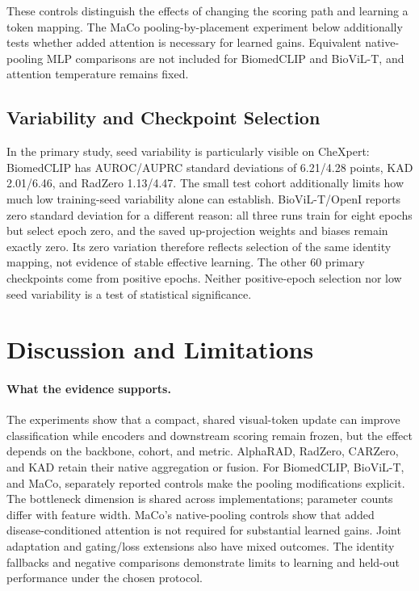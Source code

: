 \documentclass[10pt,twocolumn,letterpaper]{article}
\begin{document}
These controls distinguish the effects of changing the scoring path and learning a token mapping. The MaCo pooling-by-placement experiment below additionally tests whether added attention is necessary for learned gains. Equivalent native-pooling MLP comparisons are not included for BiomedCLIP and BioViL-T, and attention temperature remains fixed.



\subsection{Variability and Checkpoint Selection}
In the primary study, seed variability is particularly visible on CheXpert: BiomedCLIP has AUROC/AUPRC standard deviations of 6.21/4.28 points, KAD 2.01/6.46, and RadZero 1.13/4.47. The small test cohort additionally limits how much low training-seed variability alone can establish. BioViL-T/OpenI reports zero standard deviation for a different reason: all three runs train for eight epochs but select epoch zero, and the saved up-projection weights and biases remain exactly zero. Its zero variation therefore reflects selection of the same identity mapping, not evidence of stable effective learning. The other 60 primary checkpoints come from positive epochs. Neither positive-epoch selection nor low seed variability is a test of statistical significance.

\section{Discussion and Limitations}
\paragraph{What the evidence supports.}
The experiments show that a compact, shared visual-token update can improve classification while encoders and downstream scoring remain frozen, but the effect depends on the backbone, cohort, and metric. AlphaRAD, RadZero, CARZero, and KAD retain their native aggregation or fusion. For BiomedCLIP, BioViL-T, and MaCo, separately reported controls make the pooling modifications explicit. The bottleneck dimension is shared across implementations; parameter counts differ with feature width. MaCo's native-pooling controls show that added disease-conditioned attention is not required for substantial learned gains. Joint adaptation and gating/loss extensions also have mixed outcomes. The identity fallbacks and negative comparisons demonstrate limits to learning and held-out performance under the chosen protocol.
\end{document}
